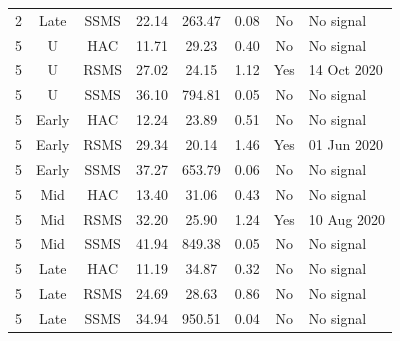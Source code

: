 \begin{table}[htbp]
\begin{tabular}{cccccccl}
2 & Late & SSMS & 22.14 & 263.47 & 0.08 & No & No signal \\
5 & U & HAC & 11.71 & 29.23 & 0.40 & No & No signal \\
5 & U & RSMS & 27.02 & 24.15 & 1.12 & Yes & 14 Oct 2020 \\
5 & U & SSMS & 36.10 & 794.81 & 0.05 & No & No signal \\
5 & Early & HAC & 12.24 & 23.89 & 0.51 & No & No signal \\
5 & Early & RSMS & 29.34 & 20.14 & 1.46 & Yes & 01 Jun 2020 \\
5 & Early & SSMS & 37.27 & 653.79 & 0.06 & No & No signal \\
5 & Mid & HAC & 13.40 & 31.06 & 0.43 & No & No signal \\
5 & Mid & RSMS & 32.20 & 25.90 & 1.24 & Yes & 10 Aug 2020 \\
5 & Mid & SSMS & 41.94 & 849.38 & 0.05 & No & No signal \\
5 & Late & HAC & 11.19 & 34.87 & 0.32 & No & No signal \\
5 & Late & RSMS & 24.69 & 28.63 & 0.86 & No & No signal \\
5 & Late & SSMS & 34.94 & 950.51 & 0.04 & No & No signal \\
\bottomrule
\end{tabular}
\end{table}
